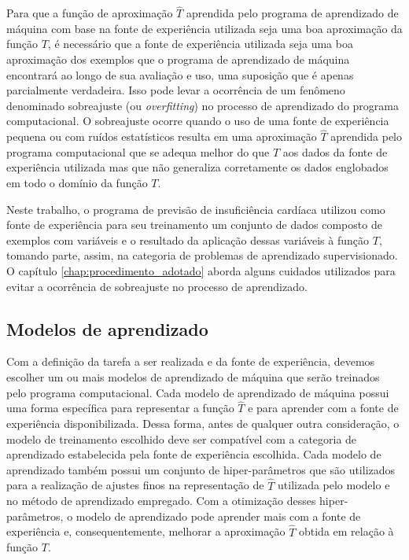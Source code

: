 Para que a função de aproximação $\hat{T}$ aprendida pelo programa de aprendizado de máquina com base na fonte de experiência utilizada seja uma boa aproximação da função $T$, é necessário que a fonte de experiência utilizada seja uma boa aproximação dos exemplos que o programa de aprendizado de máquina encontrará ao longo de sua avaliação e uso, uma suposição que é apenas parcialmente verdadeira\cite[p.6]{machine_learning}. Isso pode levar a ocorrência de um fenômeno denominado sobreajuste (ou \textit{overfitting}) no processo de aprendizado do programa computacional. O sobreajuste ocorre quando o uso de uma fonte de experiência pequena ou com ruídos estatísticos resulta em uma aproximação $\hat{T}$ aprendida pelo programa computacional que se adequa melhor do que $T$ aos dados da fonte de experiência utilizada mas que não generaliza corretamente os dados englobados em todo o domínio da função $T$\cite[p.79-80]{machine_learning}.

Neste trabalho, o programa de previsão de insuficiência cardíaca utilizou como fonte de experiência para seu treinamento um conjunto de dados\cite{larxel_dataset} composto de exemplos com variáveis e o resultado da aplicação dessas variáveis à função $T$, tomando parte, assim, na categoria de problemas de aprendizado supervisionado. O capítulo \ref{chap:procedimento_adotado} aborda alguns cuidados utilizados para evitar a ocorrência de sobreajuste no processo de aprendizado.

\subsection{Modelos de aprendizado}

Com a definição da tarefa a ser realizada e da fonte de experiência, devemos escolher um ou mais modelos de aprendizado de máquina que serão treinados pelo programa computacional. Cada modelo de aprendizado de máquina possui uma forma específica para representar a função $\hat{T}$ e para aprender com a fonte de experiência disponibilizada. Dessa forma, antes de qualquer outra consideração, o modelo de treinamento escolhido deve ser compatível com a categoria de aprendizado estabelecida pela fonte de experiência escolhida. Cada modelo de aprendizado também possui um conjunto de hiper-parâmetros que são utilizados para a realização de ajustes finos na representação de $\hat{T}$ utilizada pelo modelo e no método de aprendizado empregado. Com a otimização desses hiper-parâmetros, o modelo de aprendizado pode aprender mais com a fonte de experiência e, consequentemente, melhorar a aproximação $\hat{T}$ obtida em relação à função $T$.

